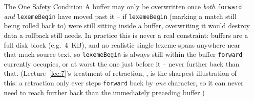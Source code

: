 \documentclass[full-course-notes.tex]{subfiles}
\begin{document}
\begin{defbox}{The One Safety Condition}
A buffer may only be overwritten once \emph{both} \texttt{forward} \emph{and}
\texttt{lexemeBegin} have moved past it -- if \texttt{lexemeBegin} (marking a match still being
rolled back to) were still sitting inside a buffer, overwriting it would destroy data a rollback
still needs. In practice this is never a real constraint: buffers are a full disk block (e.g.\
4~KB), and no realistic single lexeme spans anywhere near that much source text, so
\texttt{lexemeBegin} is always still within the buffer \texttt{forward} currently occupies, or
at worst the one just before it -- never further back than that. (Lecture~\ref{lec:7}'s
treatment of retraction, \Sref{sec:l7-retraction}, is the sharpest illustration of this: a
retraction only ever steps \texttt{forward} back by \emph{one} character, so it can never need
to reach further back than the immediately preceding buffer.)
\end{defbox}
\end{document}
